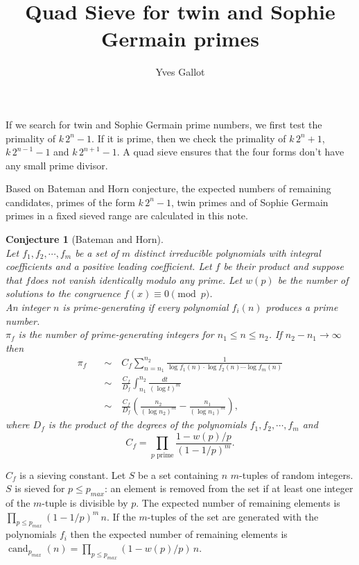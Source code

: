 \documentclass[a4paper, 12pt]{article}
\title{Quad Sieve for twin and Sophie Germain primes}
\author{Yves Gallot}
\DeclareMathOperator{\cand}{cand}
\theoremstyle{plain}
\newtheorem*{conjecture}{Conjecture}
\theoremstyle{definition}
\begin{document}
\maketitle

If we search for twin and Sophie Germain prime numbers, we first test the primality of $k\,2^n - 1$.
If it is prime, then we check the primality of $k\,2^n + 1$, $k\,2^{n-1} - 1$ and $k\,2^{n+1} - 1$.
A quad sieve ensures that the four forms don't have any small prime divisor.

\medskip

Based on Bateman and Horn conjecture, the expected numbers of remaining candidates,
primes of the form $k\,2^n - 1$, twin primes and of Sophie Germain primes in a fixed
sieved range are calculated in this note. 

\begin{conjecture}[Bateman and Horn]$ $\\
Let $f_1, f_2, \cdots, f_m$ be a set of $m$ distinct irreducible polynomials
with integral coefficients and a positive leading coefficient.
Let $f$ be their product and suppose that $f$does not vanish identically modulo any prime. 
Let $w(p)$ be the number of solutions to the congruence $f(x) \equiv 0 \pmod p$.\\
An integer $n$ is prime-generating if every polynomial $f_i(n)$ produces a prime number.\\
$\pi_f$ is the number of prime-generating integers for $n_1 \leq n \leq n_2$.
If $n_2 - n_1 \to \infty$ then
\begin{equation*}
\begin{split}
\pi_f \quad
 &\sim \quad C_f \sum_{n = n_1}^{n_2} \frac{1}{\log f_1(n) \cdot \log f_2(n) \cdots \log f_m(n)} \\
 &\sim \quad \frac{C_f}{D_f} \int_{n_1}^{n_2} \frac{dt}{\left(\log t\right)^m}\\
 &\sim \quad \frac{C_f}{D_f} \left( \frac{n_2}{\left(\log n_2\right)^m}
           - \frac{n_1}{\left(\log n_1\right)^m}\right),
\end{split}
\end{equation*}
where $D_f$ is the product of the degrees of the polynomials $f_1, f_2, \cdots, f_m$ and
\[C_f = \prod_{p\text{ prime}} \frac{1 - w(p)/p}{\left(1 - 1/p\right)^m}.\]
\end{conjecture}

\medskip

$C_f$ is a sieving constant. Let $S$ be a set containing $n$ $m$-tuples of random integers.
$S$ is sieved for $p \leq p_{max}$: an element is removed from the set if at least one
integer of the $m$-tuple is divisible by $p$. The expected number of remaining elements
is $\prod_{p\leq p_{max}}\left(1 - 1/p\right)^m\,n$. If the $m$-tuples of the set are
generated with the polynomials $f_i$ then the expected number of remaining elements
is $\cand_{p_{max}}(n) = \prod_{p\leq p_{max}}\left(1 - w(p)/p\right)\,n$.
\end{document}
